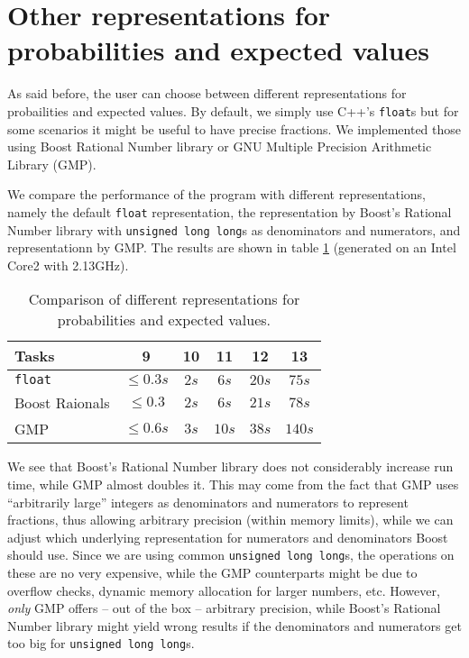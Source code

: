 \section{Other representations for probabilities and expected values}
\label{sec:benchmarks-myfloat-variations}

As said before, the user can choose between different representations for probailities and expected values. By default, we simply use C++'s \texttt{float}s but for some scenarios it might be useful to have precise fractions. We implemented those using Boost Rational Number library or GNU Multiple Precision Arithmetic Library (GMP).

We compare the performance of the program with different representations, namely the default \texttt{float} representation, the representation by Boost's Rational Number library with \texttt{unsigned long long}s as denominators and numerators, and representationn by GMP. The results are shown in table \ref{tab:comparison-myfloat-variants} (generated on an Intel Core2 with 2.13GHz).

\begin{table}[th]
  \centering
  \begin{tabular}[ht]{lccccc}
    Tasks & 9 & 10 & 11 & 12 & 13 \\
    \hline 
    \texttt{float} & $\leq 0.3s$ & $2s$ & $6s$ & $20s$ & $75s$ \\
    Boost Raionals & $\leq 0.3$ & $2s$ & $6s$ & $21s$ & $78s$ \\
    GMP & $\leq 0.6s$ & $3s$ & $10s$ & $38s$ & $140s$
  \end{tabular}
  \caption{Comparison of different representations for probabilities and expected values.}
  \label{tab:comparison-myfloat-variants}
\end{table}

We see that Boost's Rational Number library does not considerably increase run time, while GMP almost doubles it. This may come from the fact that GMP uses ``arbitrarily large'' integers as denominators and numerators to represent fractions, thus allowing arbitrary precision (within memory limits), while we can adjust which underlying representation for numerators and denominators Boost should use. Since we are using common \texttt{unsigned long long}s, the operations on these are no very expensive, while the GMP counterparts might be due to overflow checks, dynamic memory allocation for larger numbers, etc. However, \emph{only} GMP offers -- out of the box -- arbitrary precision, while Boost's Rational Number library might yield wrong results if the denominators and numerators get too big for \texttt{unsigned long long}s.

